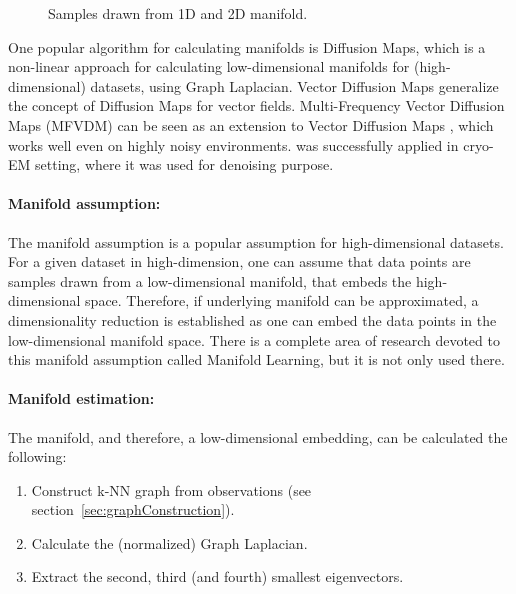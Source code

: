 \begin{figure}[H]
    \centering
    \caption{Samples drawn from 1D and 2D manifold.}
\end{figure}

One popular algorithm for calculating manifolds is Diffusion Maps\cite{diffusionMaps}, 
which is a non-linear approach for calculating low-dimensional manifolds
for (high-dimensional) datasets, using Graph Laplacian.
Vector Diffusion Maps\cite{vectorDiffusionMaps} generalize the concept of Diffusion Maps for vector fields.
Multi-Frequency Vector Diffusion Maps (MFVDM)\citet{multiDiffusionMaps} 
can be seen as an extension to Vector Diffusion Maps \cite{vectorDiffusionMaps}, 
which works well even on highly noisy environments.
\cite{multiDiffusionMaps} was successfully applied in cryo-EM setting,
 where it was used for denoising purpose\cite{cryoEmMutliDM}.

\paragraph{Manifold assumption:}
\label{sec:manifoldAssumption}
The manifold assumption is a popular assumption for high-dimensional datasets.
For a given dataset in high-dimension, one can assume that data points are samples drawn from a low-dimensional manifold,
that embeds the high-dimensional space. 
Therefore, if underlying manifold can be approximated, a dimensionality reduction
is established as one can embed the data points in the low-dimensional manifold space.
There is a complete area of research devoted to this manifold assumption called Manifold Learning\cite{ManifoldLearning},
but it is not only used there.

\paragraph{Manifold estimation:}
The manifold, and therefore, a low-dimensional embedding, can be calculated the following:

\begin{enumerate}
    \item Construct k-NN graph from observations (see section~\ref{sec:graphConstruction}).
    \item Calculate the (normalized) Graph Laplacian.
    \item Extract the second, third (and fourth) smallest eigenvectors.
\end{enumerate}

